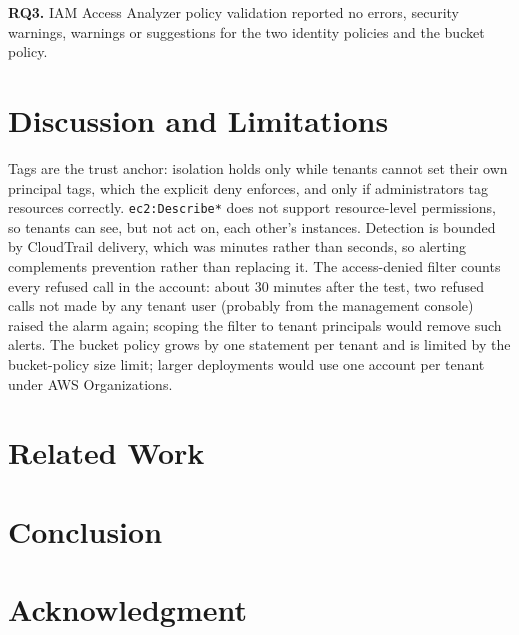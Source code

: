 \documentclass[conference]{IEEEtran}
\begin{document}
\textbf{RQ3.} IAM Access Analyzer policy validation reported no errors, security warnings, warnings or suggestions for the two identity policies and the bucket policy.

\section{Discussion and Limitations}
Tags are the trust anchor: isolation holds only while tenants cannot set their own principal tags, which the explicit deny enforces, and only if administrators tag resources correctly. \texttt{ec2:Describe*} does not support resource-level permissions, so tenants can see, but not act on, each other's instances. Detection is bounded by CloudTrail delivery, which was minutes rather than seconds, so alerting complements prevention rather than replacing it. The access-denied filter counts every refused call in the account: about 30 minutes after the test, two refused calls not made by any tenant user (probably from the management console) raised the alarm again; scoping the filter to tenant principals would remove such alerts. The bucket policy grows by one statement per tenant and is limited by the bucket-policy size limit; larger deployments would use one account per tenant under AWS Organizations.

\section{Related Work}

\section{Conclusion}

\section*{Acknowledgment}



\end{document}
